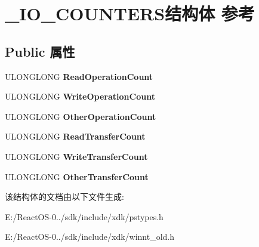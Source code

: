 \hypertarget{struct___i_o___c_o_u_n_t_e_r_s}{}\section{\+\_\+\+I\+O\+\_\+\+C\+O\+U\+N\+T\+E\+R\+S结构体 参考}
\label{struct___i_o___c_o_u_n_t_e_r_s}
\subsection*{Public 属性}
\begin{DoxyCompactItemize}
\item 
\mbox{\label{struct___i_o___c_o_u_n_t_e_r_s_a2ba02b9bf93144dfa76925b63bb7800d}} 
U\+L\+O\+N\+G\+L\+O\+NG {\bfseries Read\+Operation\+Count}
\item 
\mbox{\label{struct___i_o___c_o_u_n_t_e_r_s_ab5667912a3e3350789832352ac603b18}} 
U\+L\+O\+N\+G\+L\+O\+NG {\bfseries Write\+Operation\+Count}
\item 
\mbox{\label{struct___i_o___c_o_u_n_t_e_r_s_af5fb73028703209350223c5d52fb53a8}} 
U\+L\+O\+N\+G\+L\+O\+NG {\bfseries Other\+Operation\+Count}
\item 
\mbox{\label{struct___i_o___c_o_u_n_t_e_r_s_acc1c74f3137f13b6d4981e2e27b1f140}} 
U\+L\+O\+N\+G\+L\+O\+NG {\bfseries Read\+Transfer\+Count}
\item 
\mbox{\label{struct___i_o___c_o_u_n_t_e_r_s_a3a0c16fa0c7d7faddae649f01cc1e94d}} 
U\+L\+O\+N\+G\+L\+O\+NG {\bfseries Write\+Transfer\+Count}
\item 
\mbox{\label{struct___i_o___c_o_u_n_t_e_r_s_affbefb025d21c132fee11f2c9a794449}} 
U\+L\+O\+N\+G\+L\+O\+NG {\bfseries Other\+Transfer\+Count}
\end{DoxyCompactItemize}


该结构体的文档由以下文件生成\+:\begin{DoxyCompactItemize}
\item 
E\+:/\+React\+O\+S-\/0../sdk/include/xdk/pstypes.\+h\item 
E\+:/\+React\+O\+S-\/0../sdk/include/xdk/winnt\+\_\+old.\+h\end{DoxyCompactItemize}
